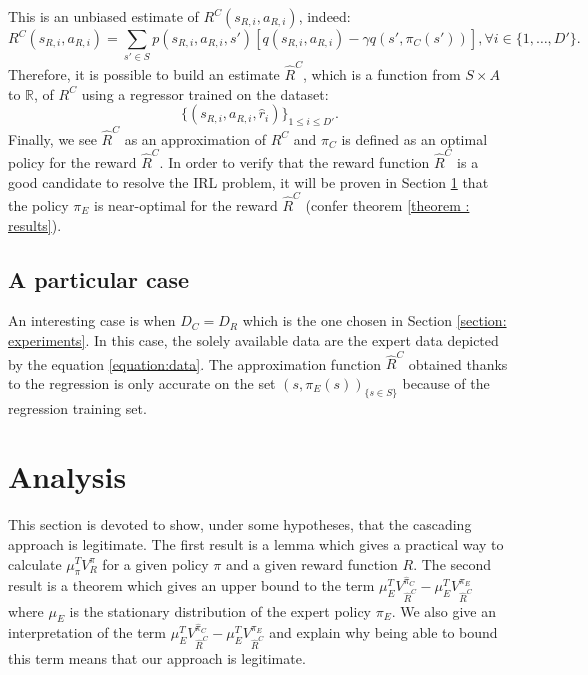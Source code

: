 \documentclass{article} %
\newcommand{\0}{\mathbf{0}}
\newcommand{\1}{\mathbf{1}}
\begin{document}
This is an unbiased estimate of $R^C(s_{R,i},a_{R,i})$, indeed:
\begin{equation}
R^C(s_{R,i},a_{R,i})=\sum_{s'\in S}p(s_{R,i},a_{R,i},s')[q(s_{R,i},a_{R,i})-\gamma q(s',\pi_C(s'))], \forall i\in \{1,\dots,D'\}.
\end{equation}
Therefore, it is possible to build an estimate $\hat{R}^C$, which is a function from $S\times A$ to $\mathbb{R}$, of $R^C$ using a regressor trained on the dataset:
\begin{equation}
\{(s_{R,i},a_{R,i},\hat{r}_i)\}_{1\leq i \leq D'}.
\end{equation}
Finally, we see $\hat{R}^C$ as an approximation of $R^C$ and $\hat{\pi}_C$ is defined as an optimal policy for the reward $\hat{R}^C$. In order to verify that the reward function $\hat{R}^C$ is a good candidate to resolve the IRL problem, it will be proven in Section \ref{section: Analysis} that the policy $\pi_E$ is near-optimal for the reward $\hat{R}^C$ (confer theorem \ref{theorem : results}).
\subsection{A particular case}
An interesting case is  when $D_C=D_R$ which is the one chosen in Section \ref{section: experiments}.
In this case, the solely available data are the expert data depicted by the equation \ref{equation:data}.
The approximation function $\hat{R}^C$ obtained thanks to the regression is only accurate on the set $(s,\pi_E(s))_{\{s\in S\}}$ because of the
regression training set.
\section{Analysis} \label{section: Analysis}
This section is devoted to show, under some hypotheses, that the cascading approach is legitimate. The first result is a lemma which gives a practical way to calculate $\mu_\pi^TV^{\pi}_R$ for a given policy $\pi$ and a given reward function $R$. The second result is a theorem which gives an upper bound to the term $\mu_E^TV^{\hat{\pi}_C}_{\hat{R}^C}-\mu_E^TV^{\pi_E}_{\hat{R}^C}$ where $\mu_E$ is the stationary distribution of the expert policy $\pi_E$. We also give an interpretation of the term $\mu_E^TV^{\hat{\pi}_C}_{\hat{R}^C}-\mu_E^TV^{\pi_E}_{\hat{R}^C}$ and explain why being able to bound this term means that our approach is legitimate.
\end{document}
